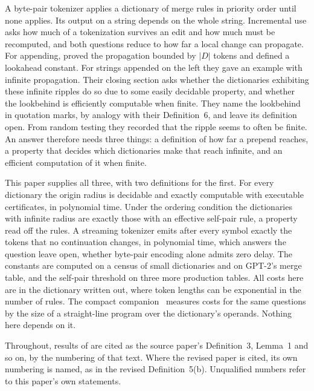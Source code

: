 \documentclass[11pt,a4paper]{article}
\theoremstyle{definition}
\theoremstyle{plain}
\begin{document}
A byte-pair tokenizer applies a dictionary of merge rules in priority order until none applies. Its output on a string
depends on the whole string. Incremental use asks how much of a tokenization survives an edit and how much must be
recomputed, and both questions reduce to how far a local change can propagate. For appending,
\citet{berglund2023formalizing} proved the propagation bounded by \(|D|\) tokens and defined a lookahead constant. For
strings appended on the left they gave an example with infinite propagation. Their closing section asks whether the
dictionaries exhibiting these infinite ripples do so due to some easily decidable property, and whether the lookbehind
is efficiently computable when finite. They name the lookbehind in quotation marks, by analogy with their Definition~6,
and leave its definition open. From random testing they recorded that the ripple seems to often be finite. An answer
therefore needs three things: a definition of how far a prepend reaches, a property that decides which dictionaries make
that reach infinite, and an efficient computation of it when finite.

This paper supplies all three, with two definitions for the first. For every dictionary the origin radius is decidable
and exactly computable with executable certificates, in polynomial time. Under the ordering condition the dictionaries
with infinite radius are exactly those with an effective self-pair rule, a property read off the rules. A streaming
tokenizer emits after every symbol exactly the tokens that no continuation changes, in polynomial time, which answers
the question \citet{dalirrooyfard2026online} leave open, whether byte-pair encoding alone admits zero delay. The
constants are computed on a census of \CensusTotal{} small dictionaries and on GPT-2's merge table, and the self-pair
threshold on three more production tables. All costs here are in the dictionary written out, where token lengths can be
exponential in the number of rules. The compact companion~\citep{nidhogg2026compact} measures costs for the same
questions by the size of a straight-line program over the dictionary's operands. Nothing here depends on it.

Throughout, results of \citet{berglund2023formalizing} are cited as the source paper's Definition~3, Lemma~1 and so on,
by the numbering of that text. Where the revised paper \citep{berglund2024formalizing} is cited, its own numbering is
named, as in the revised Definition~5(b). Unqualified numbers refer to this paper's own statements.
\end{document}

